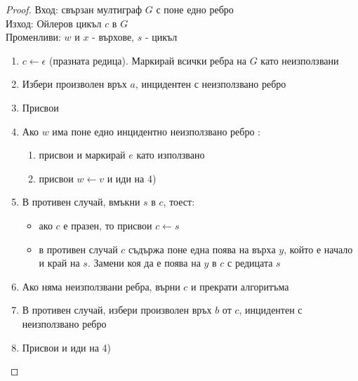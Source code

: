 \begin{proof}
    Вход: свързан мултиграф \(G\) с поне едно ребро \\
    Изход: Ойлеров цикъл \(c\) в \(G\) \\
    Променливи: \(w\) и \(x\) - върхове, \(s\) - цикъл \\
    \begin{enumerate}
        \item \(c \leftarrow \epsilon\) (празната редица). Маркирай всички ребра на \(G\) 
        като неизползвани
        \item Избери произволен връх \(a\), инцидентен с неизползвано ребро
        \item Присвои 
        \item Ако \(w\) има поне едно инцидентно неизползвано ребро :
        \begin{enumerate}
            \item присвои  и маркирай \(e\) като използвано
            \item присвои \(w \leftarrow v\) и иди на 4)
        \end{enumerate}
        \item В противен случай, вмъкни \(s\) в \(c\), тоест:
        \begin{itemize}
            \item ако \(c\) е празен, то присвои \(c \leftarrow s\)
            \item в противен случай \(c\) съдържа поне една поява на върха \(y\), който е начало и 
            край на \(s\). Замени коя да е поява на \(y\) в \(c\) с редицата \(s\)
        \end{itemize}
        \item Ако няма неизползвани ребра, върни \(c\) и прекрати алгоритъма
        \item В противен случай, избери произволен връх \(b\) от \(c\), инцидентен с неизползвано ребро
        \item Присвои  и иди на 4)
    \end{enumerate} 
\end{proof}

